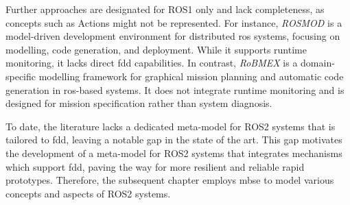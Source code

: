 Further approaches are designated for ROS1 only and lack completeness, as concepts such as Actions might not be represented.
For instance, \emph{ROSMOD} \cite{ROSMOD} is a model-driven development environment for distributed \ac{ros} systems, focusing on modelling, code generation, and deployment. While it supports runtime monitoring, it lacks direct \acl{fdd} capabilities. In contrast, \emph{RoBMEX} \cite{RobMex} is a domain-specific modelling framework for graphical mission planning and automatic code generation in \ac{ros}-based systems. It does not integrate runtime monitoring and is designed for mission specification rather than system diagnosis.

To date, the literature lacks a dedicated meta-model for ROS2 systems that is tailored to \acl{fdd}, leaving a notable gap in the state of the art.
This gap motivates the development of a meta-model for ROS2 systems that integrates mechanisms which support \acl{fdd}, paving the way for more resilient and reliable rapid prototypes. Therefore, the subsequent chapter employs \acl{mbse} to model various concepts and aspects of ROS2 systems.